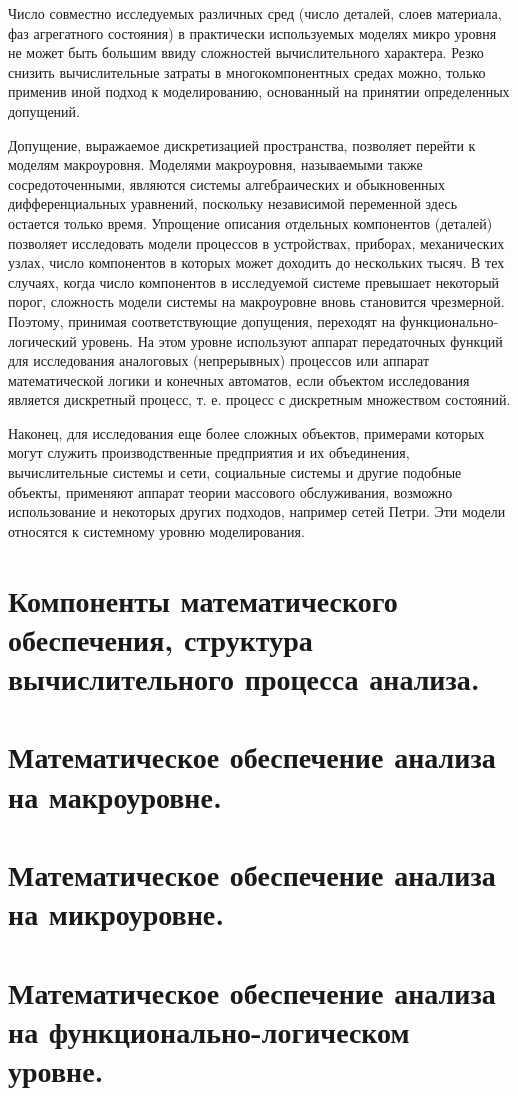 \documentclass[unicode, 12pt, a4paper, oneside]{article}
\begin{document}
Число совместно исследуемых различных сред (число деталей, слоев материала, фаз агрегатного состояния) в практически используемых моделях микро уровня не может быть большим ввиду сложностей вычислительного характера. Резко снизить вычислительные затраты в многокомпонентных средах можно, только применив иной подход к моделированию, основанный на принятии определенных допущений.

Допущение, выражаемое дискретизацией пространства, позволяет перейти к моделям макроуровня. Моделями макроуровня, называемыми также сосредоточенными, являются системы алгебраических и обыкновенных дифференциальных уравнений, поскольку независимой переменной здесь остается только время. Упрощение описания отдельных компонентов (деталей) позволяет исследовать модели процессов в устройствах, приборах, механических узлах, число компонентов в которых может доходить до нескольких тысяч. В тех случаях, когда число компонентов в исследуемой системе превышает некоторый порог, сложность модели системы на макроуровне вновь становится чрезмерной. Поэтому, принимая соответствующие допущения, переходят на функционально-логический уровень. На этом уровне используют аппарат передаточных функций для исследования аналоговых (непрерывных) процессов или аппарат математической логики и конечных автоматов, если объектом исследования является дискретный процесс, т. е. процесс с дискретным множеством состояний.

Наконец, для исследования еще более сложных объектов, примерами которых могут служить производственные предприятия и их объединения, вычислительные системы и сети, социальные системы и другие подобные объекты, применяют аппарат теории массового обслуживания, возможно использование и некоторых других подходов, например сетей Петри. Эти модели относятся к
системному уровню моделирования.

\section{Компоненты математического обеспечения, структура вычислительного процесса анализа.}
\section{Математическое обеспечение анализа на макроуровне.}
\section{Математическое обеспечение анализа на микроуровне.}
\section{Математическое обеспечение анализа на функционально-логическом уровне.}
\end{document}
